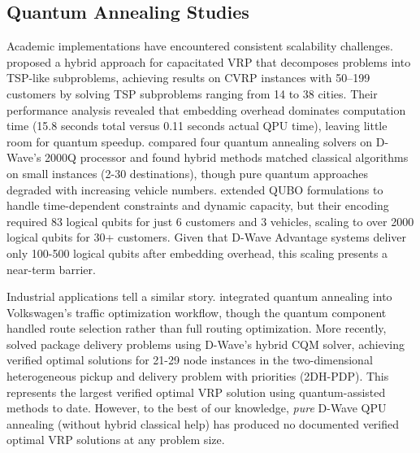 \documentclass[preprint,3p,12pt,authoryear]{elsarticle}
\begin{document}
\subsection{Quantum Annealing Studies}

Academic implementations have encountered consistent scalability challenges. \citet{feld2019hybrid} proposed a hybrid approach for capacitated VRP that decomposes problems into TSP-like subproblems, achieving results on CVRP instances with 50–199 customers by solving TSP subproblems ranging from 14 to 38 cities. Their performance analysis revealed that embedding overhead dominates computation time (15.8 seconds total versus 0.11 seconds actual QPU time), leaving little room for quantum speedup. \citet{borowski2020new} compared four quantum annealing solvers on D-Wave's 2000Q processor and found hybrid methods matched classical algorithms on small instances (2-30 destinations), though pure quantum approaches degraded with increasing vehicle numbers. \citet{irie2019quantum} extended QUBO formulations to handle time-dependent constraints and dynamic capacity, but their encoding required 83 logical qubits for just 6 customers and 3 vehicles, scaling to over 2000 logical qubits for 30+ customers. Given that D-Wave Advantage systems deliver only 100-500 logical qubits after embedding overhead, this scaling presents a near-term barrier.

Industrial applications tell a similar story. \citet{neukart2017traffic} integrated quantum annealing into Volkswagen's traffic optimization workflow, though the quantum component handled route selection rather than full routing optimization. More recently, \citet{osaba2024solving} solved package delivery problems using D-Wave's hybrid CQM solver, achieving verified optimal solutions for 21-29 node instances in the two-dimensional heterogeneous pickup and delivery problem with priorities (2DH-PDP). This represents the largest verified optimal VRP solution using quantum-assisted methods to date. However, to the best of our knowledge, \emph{pure} D-Wave QPU annealing (without hybrid classical help) has produced no documented verified optimal VRP solutions at any problem size.
\end{document}
